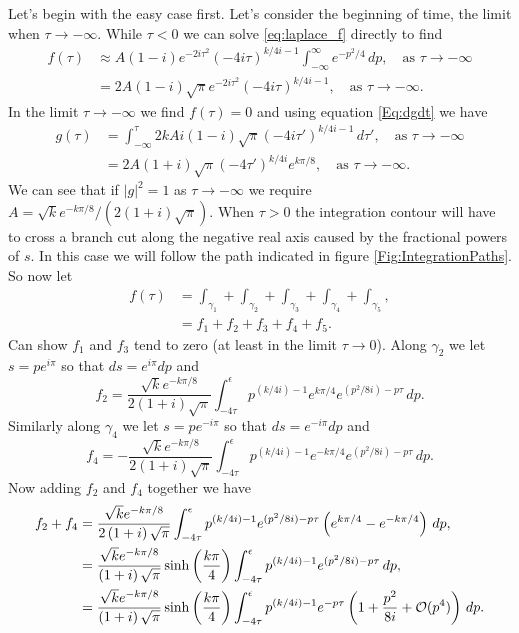 Let's begin with the easy case first.
Let's consider the beginning of time, the limit when $\tau \to -\infty$.
While $\tau < 0$ we can solve \autoref{eq:laplace_f} directly to find
\begin{align}
	f(\tau) &\approx A\left(1-i\right)e^{-2i\tau^{2}}\left(-4i \tau\right)^{k/4i-1}\int_{-\infty}^{\infty}e^{-p^{2}/4}\, dp, \quad \text{as } \tau \to -\infty\\
	&= 2A\left(1-i\right)\sqrt{\pi}e^{-2i\tau^{2}}\left(-4i \tau\right)^{k/4i-1}, \quad \text{as } \tau \to -\infty.
\end{align}
In the limit $\tau \to -\infty$ we find $f(\tau) = 0$ and using equation \eqref{Eq:dgdt} we have 
\begin{align}
	g(\tau) &= \int_{-\infty}^{\tau}2kAi\left(1-i\right)\sqrt{\pi}\left(-4i \tau' \right)^{k/4i-1}\, d\tau', \quad \text{as } \tau \to -\infty\\
	&= 2A\left(1+i\right)\sqrt{\pi}\left(-4 \tau' \right)^{k/4i}e^{k\pi/8} , \quad \text{as } \tau \to -\infty.
\end{align}
We can see that if $\left\vert g\right\vert^{2} = 1$ as $\tau \to - \infty$ we require $A = \sqrt{k}e^{-k\pi/8}/(2(1+i)\sqrt{\pi})$.
When $\tau >0$ the integration contour will have to cross a branch cut along the negative real axis caused by the fractional powers of $s$. 
In this case we will follow the path indicated in figure \ref{Fig:IntegrationPaths}. 
So now let
\begin{align}
	f(\tau) &= \int_{\gamma_{1}} + \int_{\gamma_{2}} + \int_{\gamma_{3}} + \int_{\gamma_{4}} + \int_{\gamma_{5}},\\
	&= f_{1} + f_{2} + f_{3} + f_{4} + f_{5} .
\end{align}
Can show $f_{1}$ and $f_{3}$ tend to zero (at least in the limit $\tau \to 0$). Along $\gamma_{2}$ we let $s = pe^{i \pi}$ so that $ds = e^{i \pi}dp$ and
\begin{equation}
	f_{2} = \frac{\sqrt{k} e^{-k\pi/8}}{2\left(1+i\right)\sqrt{\pi}}\int_{-4\tau}^{\epsilon} p^{(k/4i)-1}e^{k\pi/4}e^{(p^{2}/8i) -p\tau}\, dp.
\end{equation}
Similarly along $\gamma_{4}$ we let $s = pe^{-i\pi}$ so that $ds = e^{-i\pi}dp$ and
\begin{equation}
	f_{4} = -\frac{\sqrt{k} e^{-k\pi/8}}{2\left(1+i\right)\sqrt{\pi}}\int_{-4\tau}^{\epsilon} p^{(k/4i)-1}e^{-k\pi/4}e^{(p^{2}/8i) -p\tau}\, dp.
\end{equation}
Now adding $f_{2}$ and $f_{4}$ together we have
\begin{align}
	f_{2} + f_{4} &= \frac{\sqrt{k} e^{-k\pi/8}}{2\left(1+i\right)\sqrt{\pi}}\int_{-4\tau}^{\epsilon} p^{(k/4i)-1}e^{(p^{2}/8i) -p\tau}\left(e^{k\pi/4}-e^{-k\pi/4}\right)\, dp,\\
	&= \frac{\sqrt{k} e^{-k\pi/8}}{\left(1+i\right)\sqrt{\pi}}\sinh\left(\frac{k\pi}{4}\right)\int_{-4\tau}^{\epsilon} p^{(k/4i)-1}e^{(p^{2}/8i) -p\tau}\, dp,\\
	&= \frac{\sqrt{k} e^{-k\pi/8}}{\left(1+i\right)\sqrt{\pi}}\sinh\left(\frac{k\pi}{4}\right)\int_{-4\tau}^{\epsilon} p^{(k/4i)-1}e^{-p\tau}\left(1 + \frac{p^{2}}{8i} + {\cal O}(p^{4})\right)\, dp.
\end{align}
